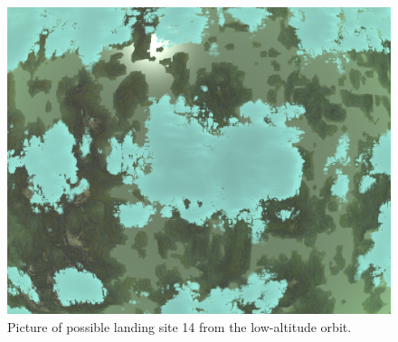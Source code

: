 \documentclass[reprint,english,notitlepage]{revtex4-2}
\begin{document}
    \begin{figure}[h]
        \centering
        \includegraphics[scale=0.14]{Figures/l_site14}
        \caption{Picture of possible landing site 14 from the low-altitude orbit.}\label{fig:l_site14}
    \end{figure}


\newpage
\printbibliography
\end{document}
